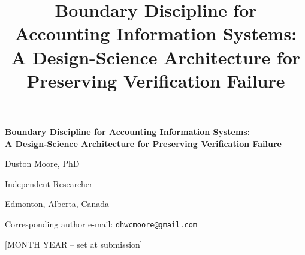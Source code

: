 \documentclass[11pt,a4paper]{article}
\title{Boundary Discipline for Accounting Information Systems:\\
A Design-Science Architecture for Preserving Verification Failure}
\author{}
\date{}
\theoremstyle{definition}
\theoremstyle{remark}
\begin{document}
\begin{titlepage}
\centering
\vspace*{2cm}
{\LARGE\bfseries Boundary Discipline for Accounting Information Systems:\\
A Design-Science Architecture for Preserving Verification Failure\par}
\vspace{2cm}
{\large Duston Moore, PhD\par}
\vspace{0.5em}
{\large Independent Researcher\par}
{\large Edmonton, Alberta, Canada\par}
\vspace{0.5em}
{\large Corresponding author e-mail: \texttt{dhwcmoore@gmail.com}\par}
\vspace{2cm}
{\large [MONTH YEAR -- set at submission]\par}
\thispagestyle{empty}
\end{titlepage}

\newpage
{}
\end{document}
